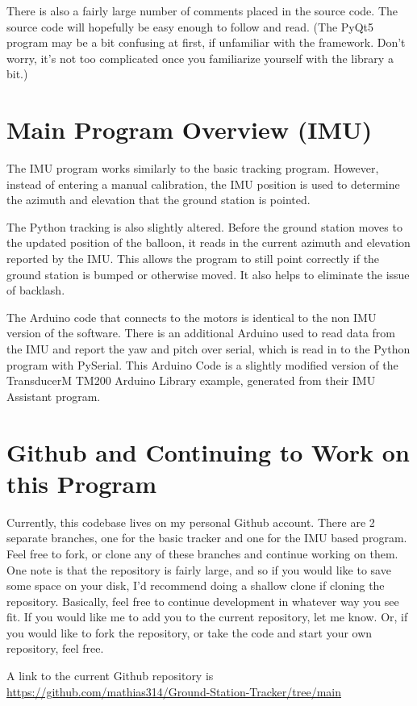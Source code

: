 \documentclass{article}
\begin{document}
There is also a fairly large number of comments placed in the source code. The source code will hopefully be easy enough to follow and read. (The PyQt5 program may be a bit confusing at first, if unfamiliar with the framework. Don't worry, it's not too complicated once you familiarize yourself with the library a bit.) 

\section{Main Program Overview (IMU)}
The IMU program works similarly to the basic tracking program. However, instead of entering a manual calibration, the IMU position is used to determine the azimuth and elevation that the ground station is pointed.

The Python tracking is also slightly altered. Before the ground station moves to the updated position of the balloon, it reads in the current azimuth and elevation reported by the IMU. This allows the program to still point correctly if the ground station is bumped or otherwise moved. It also helps to eliminate the issue of backlash. 

The Arduino code that connects to the motors is identical to the non IMU version of the software. There is an additional Arduino used to read data from the IMU and report the yaw and pitch over serial, which is read in to the Python program with PySerial. This Arduino Code is a slightly modified version of the TransducerM TM200 Arduino Library example, generated from their IMU Assistant program. 

\section{Github and Continuing to Work on this Program}
Currently, this codebase lives on my personal Github account. There are 2 separate branches, one for the basic tracker and one for the IMU based program. Feel free to fork, or clone any of these branches and continue working on them. One note is that the repository is fairly large, and so if you would like to save some space on your disk, I'd recommend doing a shallow clone if cloning the repository. 
Basically, feel free to continue development in whatever way you see fit. If you would like me to add you to the current repository, let me know. Or, if you would like to fork the repository, or take the code and start your own repository, feel free. 

A link to the current Github repository is \url{https://github.com/mathias314/Ground-Station-Tracker/tree/main}
\end{document}

